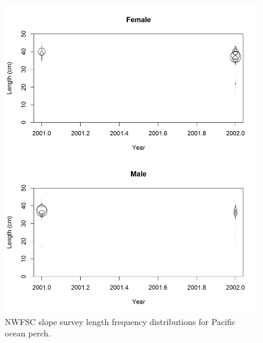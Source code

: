 \documentclass[12pt,]{article}
\begin{document}
\begin{figure}
\centering
\includegraphics{Figures/NWslope_Lengths.png}
\caption{NWFSC slope survey length frequency distributions for Pacific
ocean perch. \label{fig:nw_slope_Length}}
\end{figure}
\end{document}
